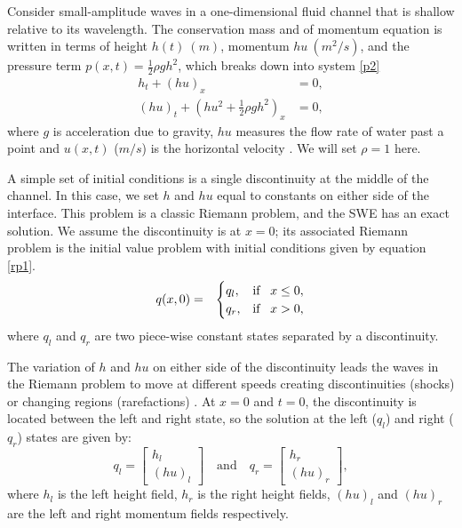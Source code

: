\documentclass[10pt,a4paper]{article}
\begin{document}
	Consider small-amplitude waves in a one-dimensional fluid channel that is shallow relative to its wavelength. The conservation mass and of momentum equation is written in terms of  height $h(t)~(m)$, momentum $hu~(m^{2}/s)$, and  the pressure term $p(x,t) = \frac{1}{2}\rho gh^{2}$, which breaks down into system \eqref{p2}
	\begin{equation}
		\begin{aligned}
			h_{t} + (hu)_x &= 0, \\
			(hu)_t + \left(hu^{2} + \frac{1}{2}\rho gh^{2} \right)_x & = 0,
		\end{aligned}
		\label{p2}
	\end{equation}	
	where $g$ is acceleration due to gravity, $hu$ measures the flow rate of water past a point and $u(x,t)$ ($m/s$) is the horizontal velocity  \citep{leveque2002finite,toro2001shock}.  We will set $\rho = 1$ here.
	
	A simple set of initial conditions is a single discontinuity at the middle of the channel.  In this case, we set $h$ and $hu$ equal to constants on either side of the interface.  This problem is a classic Riemann problem, and the SWE has an exact solution.  We assume the discontinuity is at $x = 0$; its associated Riemann problem is the initial value problem with initial conditions given by equation \eqref{rp1}.
	\begin{eqnarray}
		q(x,0)& =& \begin{cases}
			q_{l}, & \text{if \, $x \le 0,$}\\
			q_{r},& \text{if \, $x > 0,$}\\
			
		\end{cases}  
		\label{rp1}     
	\end{eqnarray}
	where $q_{l}$ and $q_{r}$ are two piece-wise constant states separated by a discontinuity. 
	
	The variation of $h$ and $hu$ on either side of the discontinuity leads the waves in the Riemann problem to move at different speeds creating discontinuities (shocks) or changing regions (rarefactions) \citep{leveque2002finite}.  At $x = 0$ and $t = 0$,   the discontinuity is located between the left and right state, so the solution at the left ($q_{l}$) and right ($q_{r}$) states are given by: 
	\begin{equation}
		q_{l} = \begin{bmatrix}
			h_{l} \\(hu)_{l}
		\end{bmatrix}  \quad \text{and} \quad q_{r} = \begin{bmatrix}
			h_{r} \\(hu)_{r}
		\end{bmatrix},
		\label{ic}
	\end{equation}
	where $h_l$ is the left height field,  $h_r$ is the right height fields, $(hu)_l$ and $(hu)_r$ are the left and right momentum fields respectively.
	
\end{document}
